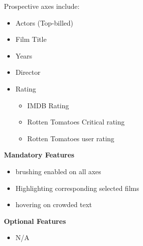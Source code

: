 \documentclass[12pt]{article}
\begin{document}
 Prospective axes include:
 
 \begin{itemize}
	\item Actors (Top-billed) 
 	\item Film Title
 	\item Years
 	\item Director
 	\item Rating
 		\begin{itemize}
 			\item IMDB Rating
 			\item Rotten Tomatoes Critical rating
 			\item Rotten Tomatoes user rating
 		\end{itemize}
 \end{itemize}
 
 
 \vspace{2em}
 
 \textbf{Mandatory Features}
 \begin{itemize}
 	\item brushing enabled on all axes
 	\item Highlighting corresponding selected films
 	\item hovering on crowded text
  	
 \end{itemize}

\vspace{2em}
 
 \textbf{Optional Features}
\begin{itemize}
	\item N/A
\end{itemize}


\newpage
\end{document}
